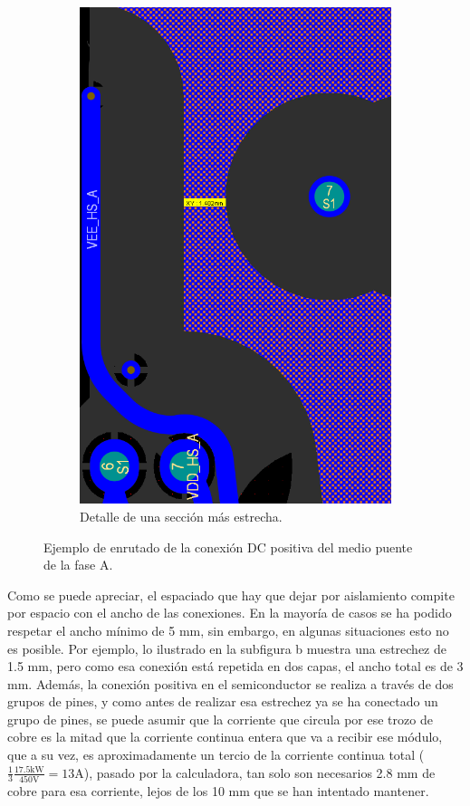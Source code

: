 \begin{figure}[H]
\begin{subfigure}{0.42\linewidth}
		\includegraphics[width=\linewidth]{fig/layout2}
		\caption{Detalle de una sección más estrecha.}
	\end{subfigure}
	\caption{Ejemplo de enrutado de la conexión DC positiva del medio puente de la fase A.}
\end{figure}

Como se puede apreciar, el espaciado que hay que dejar por aislamiento compite por espacio con el ancho de las conexiones. En la mayoría de casos se ha podido respetar el ancho mínimo de 5 mm, sin embargo, en algunas situaciones esto no es posible. Por ejemplo, lo ilustrado en la subfigura b muestra una estrechez de 1.5 mm, pero como esa conexión está repetida en dos capas, el ancho total es de 3 mm. Además, la conexión positiva en el semiconductor se realiza a través de dos grupos de pines, y como antes de realizar esa estrechez ya se ha conectado un grupo de pines, se puede asumir que la corriente que circula por ese trozo de cobre es la mitad que la corriente continua entera que va a recibir ese módulo, que a su vez, es aproximadamente un tercio de la corriente continua total ($\frac{1}{3}\frac{17.5 \text{kW}}{450 \text{V}} = 13 \text{A}$), pasado por la calculadora, tan solo son necesarios 2.8 mm de cobre para esa corriente, lejos de los 10 mm que se han intentado mantener.

